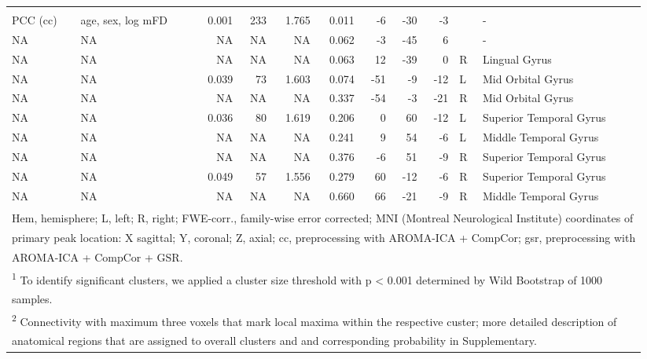 \documentclass[
]{article}
\begin{document}
\begin{landscape}
\begin{table}
{\begin{tabular}[t]{llrrrrrrrll}
\addlinespace[0.3em]
\multicolumn{11}{l}{\textbf{average BMI (decrease)}}\\
\hspace{1em}PCC (cc) & age, sex, log mFD & 0.001 & 233 & 1.765 & 0.011 & -6 & -30 & -3 &  & -\\
\hspace{1em}NA & NA & NA & NA & NA & 0.062 & -3 & -45 & 6 &  & -\\
\hspace{1em}NA & NA & NA & NA & NA & 0.063 & 12 & -39 & 0 & R & Lingual Gyrus\\
\hspace{1em}NA & NA & 0.039 & 73 & 1.603 & 0.074 & -51 & -9 & -12 & L & Mid Orbital Gyrus\\
\hspace{1em}NA & NA & NA & NA & NA & 0.337 & -54 & -3 & -21 & R & Mid Orbital Gyrus\\
\hspace{1em}NA & NA & 0.036 & 80 & 1.619 & 0.206 & 0 & 60 & -12 & L & Superior Temporal Gyrus\\
\hspace{1em}NA & NA & NA & NA & NA & 0.241 & 9 & 54 & -6 & L & Middle Temporal Gyrus\\
\hspace{1em}NA & NA & NA & NA & NA & 0.376 & -6 & 51 & -9 & R & Superior Temporal Gyrus\\
\hspace{1em}NA & NA & 0.049 & 57 & 1.556 & 0.279 & 60 & -12 & -6 & R & Superior Temporal Gyrus\\
\hspace{1em}NA & NA & NA & NA & NA & 0.660 & 66 & -21 & -9 & R & Middle Temporal Gyrus\\
\bottomrule
\multicolumn{11}{l}{\textsuperscript{} Hem, hemisphere; L, left; R, right; FWE-corr., family-wise error corrected; MNI (Montreal Neurological Institute) coordinates of}\\
\multicolumn{11}{l}{primary peak location: X sagittal; Y, coronal; Z, axial; cc, preprocessing with AROMA-ICA + CompCor; gsr, preprocessing with}\\
\multicolumn{11}{l}{AROMA-ICA + CompCor + GSR.}\\
\multicolumn{11}{l}{\textsuperscript{1} To identify significant clusters, we applied a cluster size threshold with p < 0.001 determined by Wild Bootstrap of 1000}\\
\multicolumn{11}{l}{samples.}\\
\multicolumn{11}{l}{\textsuperscript{2} Connectivity with maximum three voxels that mark local maxima within the respective custer; more detailed description of}\\
\multicolumn{11}{l}{anatomical regions that are assigned to overall clusters and and corresponding probability in Supplementary.}\\
\end{tabular}}
\end{table}
\end{landscape}
\end{document}
